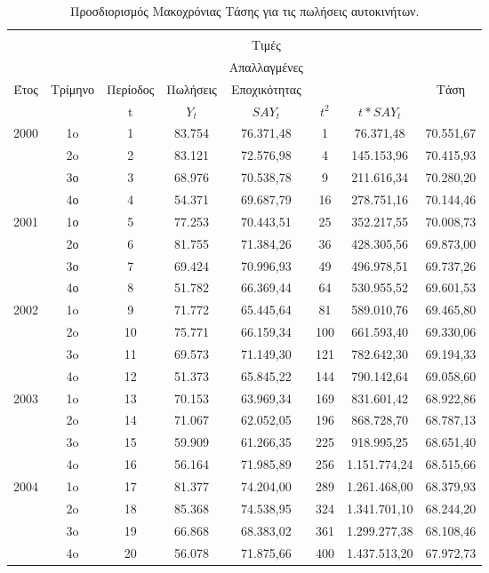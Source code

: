 \begin{table} [h]
  \caption{Προσδιορισμός Μακοχρόνιας Τάσης για τις πωλήσεις αυτοκινήτων.} 
  \label{tab_3}
  \begin{center}
    \begin{tabular}{|c|c|c|c|c|c|c|c|}
      \hline
           &   &    &    &         
           &   &    &      \\
           &    &     &    & Τιμές
           &  &     &  \\
           &  &  &  &Απαλλαγμένες &  &  &\\
       Έτος &Τρίμηνο  &Περίοδος  &Πωλήσεις  &Εποχικότητας  &  &  & Τάση \\
       & & t  & $Y_t$  & $ SAY_t$  & $t^2$  & $t*SAY_t$  &   \\
      \hline \hline
      2000 &  1o  &  1  &  83.754  &  76.371,48  &  1  & 76.371,48  &  70.551,67\\
           &  2o  &  2  &  83.121  &  72.576,98  &  4  & 145.153,96  &  70.415,93\\
           & 3ο & 3  &  68.976 & 70.538,78  & 9  & 211.616,34 & 70.280,20 \\
           & 4ο & 4 & 54.371 & 69.687,79 & 16  & 278.751,16 & 70.144,46 \\
           
        2001   & 1ο & 5  & 77.253  & 70.443,51  &  25 & 352.217,55 &  70.008,73\\
        & 2ο & 6 & 81.755 & 71.384,26 & 36  & 428.305,56 & 69.873,00\\
        & 3ο & 7  &69.424  & 70.996,93 & 49 & 496.978,51 & 69.737,26\\
        & 4ο &8  & 51.782 & 66.369,44 & 64 & 530.955,52 & 69.601,53\\
     2002   & 1o & 9 & 71.772 & 65.445,64 & 81 & 589.010,76 & 69.465,80 \\
     & 2o  & 10 & 75.771 & 66.159,34 & 100 & 661.593,40 & 69.330,06\\
     & 3o & 11 & 69.573 & 71.149,30 & 121 & 782.642,30 & 69.194,33\\
     & 4o & 12 & 51.373 & 65.845,22 &  144 & 790.142,64 &69.058,60\\
   2003  & 1o & 13 &70.153  & 63.969,34 & 169 & 831.601,42  &68.922,86\\
     & 2o & 14 &71.067 & 62.052,05 & 196 & 868.728,70 & 68.787,13\\
     & 3o & 15 & 59.909  & 61.266,35 & 225  & 918.995,25 &68.651,40\\
      & 4o & 16 & 56.164 & 71.985,89 & 256 & 1.151.774,24 & 68.515,66\\
      2004& 1o &  17& 81.377 & 74.204,00 & 289 & 1.261.468,00 & 68.379,93\\
      & 2o & 18 & 85.368 & 74.538,95  & 324 & 1.341.701,10 &68.244,20\\
      & 3o &19  & 66.868 & 68.383,02 & 361 & 1.299.277,38 &68.108,46\\
      & 4o & 20 & 56.078 & 71.875,66 & 400 & 1.437.513,20 &67.972,73\\    
      \hline
    \end{tabular}
  \end{center}
\end{table}
